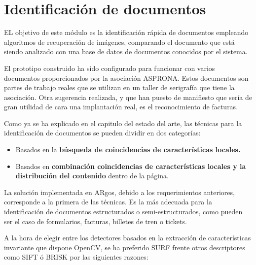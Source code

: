 



\section{Identificación de documentos}
EL objetivo de este módulo es la identificación rápida de documentos empleando algoritmos de
recuperación de imágenes, comparando el documento que está siendo analizado con una base de datos de
documentos conocidos por el sistema.

El prototipo construido ha sido configurado para funcionar con varios documentos proporcionados
por la asociación ASPRONA. Estos documentos son partes de trabajo reales que se utilizan en un
taller de serigrafía que tiene la asociación. Otra sugerencia realizada, y que han puesto de
manifiesto que sería de gran utilidad de cara una implantación real, es el reconocimiento de facturas.

Como ya se ha explicado en el capitulo del estado del arte, las técnicas para la identificación de
documentos se pueden dividir en dos categorías:

\begin{itemize}
\item Basados en la \textbf{búsqueda de coincidencias de características locales.}
\item Basados en \textbf{combinación coincidencias de características locales y la distribución del contenido} dentro de la página.
\end{itemize}

La solución implementada en ARgos, debido a los requerimientos anteriores, corresponde a la primera
de las técnicas. Es la más adecuada para la identificación de documentos estructurados o
semi-estructurados, como pueden ser el caso de formularios, facturas, billetes de tren o tickets.

A la hora de elegir entre los detectores basados en la extracción de características invariante que
dispone OpenCV, se ha preferido SURF frente otros descriptores como SIFT ó BRISK por las siguientes razones:

